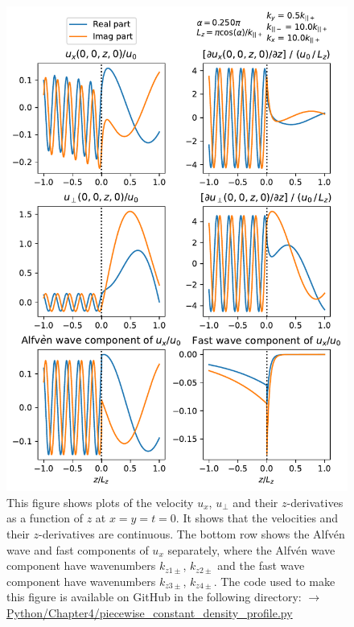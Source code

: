 \begin{figure}
    \centering
    \vspace{-20pt}
    \includegraphics[width=\textwidth,height=0.85\textheight,keepaspectratio]{figures/chapter04/piecewise_constant_density_profile.pdf}
    \vspace{-10pt}
    \caption{This figure shows plots of the velocity $u_x$, $u_\perp$ and their $z$-derivatives as a function of $z$ at $x=y=t=0$. It shows that the velocities and their $z$-derivatives are continuous. The bottom row shows the Alfv\'en wave and fast components of $u_x$ separately, where the Alfv\'en wave component have wavenumbers $k_{z1\pm}$, $k_{z2\pm}$ and the fast wave component have wavenumbers $k_{z3\pm}$, $k_{z4\pm}$. The code used to make this figure is available on GitHub in the following directory:\newline
    \href{https://github.com/aleksyprok/apkp_thesis/blob/main/Python/Chapter4/piecewise_constant_density_profile.py}{$\rightarrow$ Python/Chapter4/piecewise\_constant\_density\_profile.py}}
    \vspace{-20pt}
    \label{fig:piecewise_constant_density_profile}
\end{figure}


